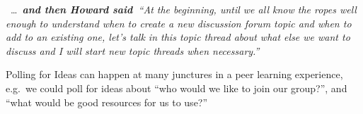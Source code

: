 ~\ldots{}~\textbf{\emph{and then Howard said~}}\emph{``At the beginning,
until we all know the ropes well enough to understand when to create a
new discussion forum topic and when to add to an existing one, let's
talk in this topic thread about what else we want to discuss and I will
start new topic threads when necessary.''}

Polling for Ideas can happen at many junctures in a peer learning
experience, e.g.~we could poll for ideas about ``who would we like to
join our group?'', and ``what would be good resources for us to use?''
